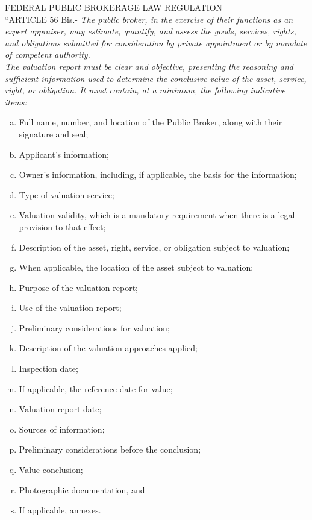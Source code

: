 \textcolor{principal}{FEDERAL PUBLIC BROKERAGE LAW REGULATION}\\


``\textcolor{secundario}{ARTICLE 56 Bis.-} \textit{The public broker, in the exercise of their functions as an expert appraiser, may estimate, quantify, and assess the goods, services, rights, and obligations submitted for consideration by private appointment or by mandate of competent authority.}\\


\textit{The valuation report must be clear and objective, presenting the reasoning and sufficient information used to determine the conclusive value of the asset, service, right, or obligation. It must contain, at a minimum, the following indicative items:}

\begin{enumerate}[a)]

\item  Full name, number, and location of the Public Broker, along with their signature and seal; 
\item Applicant's information;
\item  Owner's information, including, if applicable, the basis for the information; 
\item  Type of valuation service;
\item Valuation validity, which is a mandatory requirement when there is a legal provision to that effect;
 \item  Description of the asset, right, service, or obligation subject to valuation;
 \item  When applicable, the location of the asset subject to valuation;
 \item  Purpose of the valuation report;
\item  Use of the valuation report;
\item  Preliminary considerations for valuation;
\item  Description of the valuation approaches applied;
\item  Inspection date;
\item  If applicable, the reference date for value;
\item  Valuation report date;
\item  Sources of information;
\item  Preliminary considerations before the conclusion; 
\item  Value conclusion;
\item  Photographic documentation, and 
\item  If applicable, annexes.

\end{enumerate}

